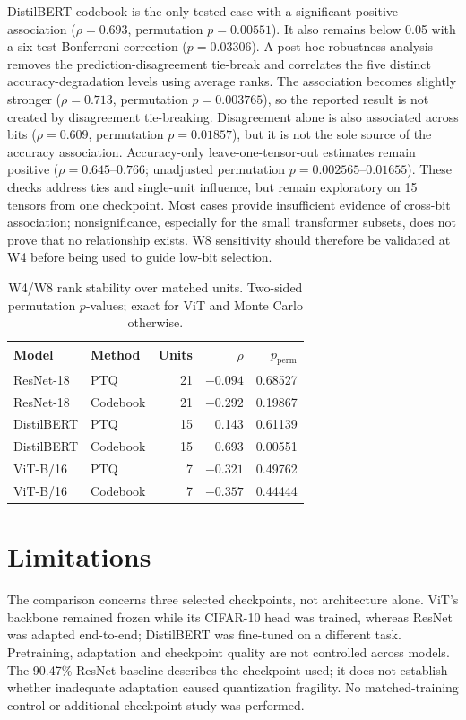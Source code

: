 \documentclass[conference]{IEEEtran}
\begin{document}
DistilBERT codebook is the only tested case with a significant positive association ($\rho=0.693$, permutation $p=0.00551$). It also remains below 0.05 with a six-test Bonferroni correction ($p=0.03306$). A post-hoc robustness analysis removes the prediction-disagreement tie-break and correlates the five distinct accuracy-degradation levels using average ranks. The association becomes slightly stronger ($\rho=0.713$, permutation $p=0.003765$), so the reported result is not created by disagreement tie-breaking. Disagreement alone is also associated across bits ($\rho=0.609$, permutation $p=0.01857$), but it is not the sole source of the accuracy association. Accuracy-only leave-one-tensor-out estimates remain positive ($\rho=0.645$--$0.766$; unadjusted permutation $p=0.002565$--$0.01655$). These checks address ties and single-unit influence, but remain exploratory on 15 tensors from one checkpoint. Most cases provide insufficient evidence of cross-bit association; nonsignificance, especially for the small transformer subsets, does not prove that no relationship exists. W8 sensitivity should therefore be validated at W4 before being used to guide low-bit selection.

\begin{table}[!t]
\centering
\caption{W4/W8 rank stability over matched units. Two-sided permutation $p$-values; exact for ViT and Monte Carlo otherwise.}
\label{tab:cross-bit-rank-stability}
\small
\setlength{\tabcolsep}{4pt}
\begin{tabular}{@{}llrrr@{}}
\toprule
Model & Method & Units & $\rho$ & $p_{\mathrm{perm}}$ \\
\midrule
ResNet-18 & PTQ & 21 & $-0.094$ & 0.68527 \\
ResNet-18 & Codebook & 21 & $-0.292$ & 0.19867 \\
DistilBERT & PTQ & 15 & 0.143 & 0.61139 \\
DistilBERT & Codebook & 15 & 0.693 & 0.00551 \\
ViT-B/16 & PTQ & 7 & $-0.321$ & 0.49762 \\
ViT-B/16 & Codebook & 7 & $-0.357$ & 0.44444 \\
\bottomrule
\end{tabular}
\end{table}

\section{Limitations}

The comparison concerns three selected checkpoints, not architecture alone. ViT's backbone remained frozen while its CIFAR-10 head was trained, whereas ResNet was adapted end-to-end; DistilBERT was fine-tuned on a different task. Pretraining, adaptation and checkpoint quality are not controlled across models. The 90.47\% ResNet baseline describes the checkpoint used; it does not establish whether inadequate adaptation caused quantization fragility. No matched-training control or additional checkpoint study was performed.
\end{document}

